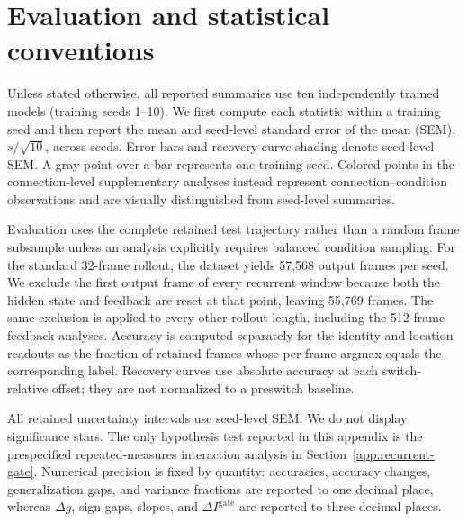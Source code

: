 \providecommand{\dg}{\Delta g}

\appendix

\section*{Evaluation and statistical conventions}
\label{app:statistical-conventions}

Unless stated otherwise, all reported summaries use ten independently trained models (training seeds 1--10). We first compute each statistic within a training seed and then report the mean and seed-level standard error of the mean (SEM), \(s/\sqrt{10}\), across seeds. Error bars and recovery-curve shading denote seed-level SEM. A gray point over a bar represents one training seed. Colored points in the connection-level supplementary analyses instead represent connection--condition observations and are visually distinguished from seed-level summaries.

Evaluation uses the complete retained test trajectory rather than a random frame subsample unless an analysis explicitly requires balanced condition sampling. For the standard 32-frame rollout, the dataset yields 57,568 output frames per seed. We exclude the first output frame of every recurrent window because both the hidden state and feedback are reset at that point, leaving 55,769 frames. The same exclusion is applied to every other rollout length, including the 512-frame feedback analyses. Accuracy is computed separately for the identity and location readouts as the fraction of retained frames whose per-frame argmax equals the corresponding label. Recovery curves use absolute accuracy at each switch-relative offset; they are not normalized to a preswitch baseline.

All retained uncertainty intervals use seed-level SEM. We do not display significance stars. The only hypothesis test reported in this appendix is the prespecified repeated-measures interaction analysis in Section~\ref{app:recurrent-gate}. Numerical precision is fixed by quantity: accuracies, accuracy changes, generalization gaps, and variance fractions are reported to one decimal place, whereas \(\dg\), sign gaps, slopes, and \(\Delta I^{\mathrm{gate}}\) are reported to three decimal places.

